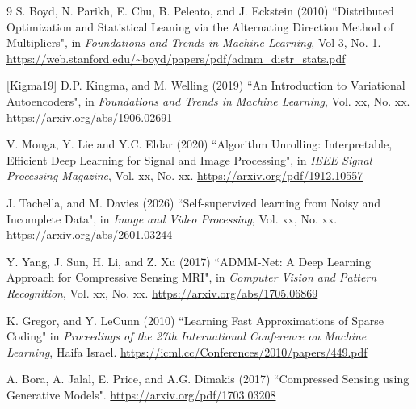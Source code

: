 \documentclass[12pt]{article}
\begin{document}
\begin{thebibliography}{9}
 S. Boyd, N. Parikh, E. Chu, B. Peleato, and J. Eckstein (2010) ``Distributed Optimization and Statistical Leaning via the Alternating Direction Method of Multipliers", in \emph{Foundations and Trends in Machine Learning}, Vol 3, No. 1. \url{https://web.stanford.edu/~boyd/papers/pdf/admm_distr_stats.pdf}

[Kigma19] 
D.P. Kingma, and M. Welling (2019) ``An Introduction to Variational Autoencoders", in \emph{Foundations and Trends in Machine Learning}, Vol. xx, No. xx.
\url{https://arxiv.org/abs/1906.02691}

V. Monga, Y. Lie and Y.C. Eldar (2020) ``Algorithm Unrolling: Interpretable, Efficient Deep Learning for Signal and Image Processing", in \emph{IEEE Signal Processing Magazine}, Vol. xx, No. xx. \url{https://arxiv.org/pdf/1912.10557}

J. Tachella, and M. Davies (2026) ``Self-supervized learning from Noisy and Incomplete Data", in \emph{Image and Video Processing}, Vol. xx, No. xx. \url{https://arxiv.org/abs/2601.03244}

Y. Yang, J. Sun, H. Li, and Z. Xu (2017) ``ADMM-Net: A Deep Learning Approach for Compressive Sensing MRI", in \emph{Computer Vision and Pattern Recognition}, Vol. xx, No. xx. \url{https://arxiv.org/abs/1705.06869}

K. Gregor, and Y. LeCunn (2010) ``Learning Fast Approximations of Sparse Coding" in \emph{Proceedings of the 27th International Conference on Machine Learning}, Haifa Israel. \url{https://icml.cc/Conferences/2010/papers/449.pdf}

A. Bora, A. Jalal, E. Price, and A.G. Dimakis (2017) ``Compressed Sensing using Generative Models". \url{https://arxiv.org/pdf/1703.03208}
\end{thebibliography}
\end{document}
